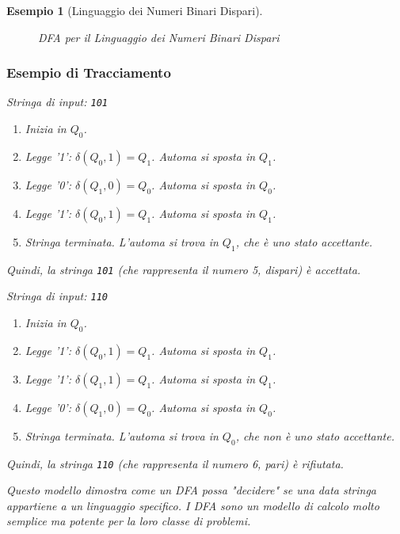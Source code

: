 \documentclass[a4paper, 11pt]{book} %
\newtheorem{example}[theorem]{Esempio}
\theoremstyle{definition}
\begin{document}
\begin{example}[Linguaggio dei Numeri Binari Dispari]
\begin{figure}[h!]
    \caption{DFA per il Linguaggio dei Numeri Binari Dispari}
\end{figure}

\subsubsection{Esempio di Tracciamento}
Stringa di input: \texttt{101}
\begin{enumerate}
    \item Inizia in $Q_0$.
    \item Legge '1': $\delta(Q_0, 1) = Q_1$. Automa si sposta in $Q_1$.
    \item Legge '0': $\delta(Q_1, 0) = Q_0$. Automa si sposta in $Q_0$.
    \item Legge '1': $\delta(Q_0, 1) = Q_1$. Automa si sposta in $Q_1$.
    \item Stringa terminata. L'automa si trova in $Q_1$, che è uno stato accettante.
\end{enumerate}
Quindi, la stringa \texttt{101} (che rappresenta il numero 5, dispari) è accettata.

Stringa di input: \texttt{110}
\begin{enumerate}
    \item Inizia in $Q_0$.
    \item Legge '1': $\delta(Q_0, 1) = Q_1$. Automa si sposta in $Q_1$.
    \item Legge '1': $\delta(Q_1, 1) = Q_1$. Automa si sposta in $Q_1$.
    \item Legge '0': $\delta(Q_1, 0) = Q_0$. Automa si sposta in $Q_0$.
    \item Stringa terminata. L'automa si trova in $Q_0$, che non è uno stato accettante.
\end{enumerate}
Quindi, la stringa \texttt{110} (che rappresenta il numero 6, pari) è rifiutata.

Questo modello dimostra come un DFA possa "decidere" se una data stringa appartiene a un linguaggio specifico. I DFA sono un modello di calcolo molto semplice ma potente per la loro classe di problemi.
\end{example}


\end{document}
